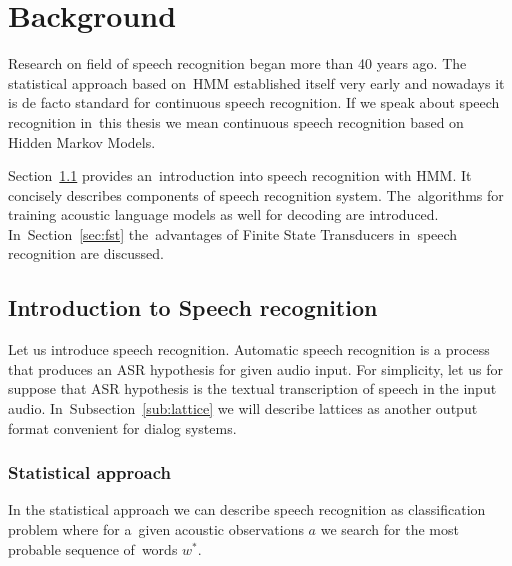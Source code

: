 \chapter{Background}
\label{cha:background}

% 
% 

Research on field of speech recognition began more than 40 years ago. The statistical approach based 
on~\ac{HMM} established itself very early and nowadays it is de facto standard for continuous speech recognition. 
If we speak about speech recognition in~this thesis we mean continuous speech recognition based on Hidden Markov Models. 

Section~\ref{sec:general_introduction} provides an~introduction into speech recognition with \ac{HMM}. 
It concisely describes components of speech recognition system. The~algorithms for training acoustic language models 
as well for decoding are introduced. In~Section~\ref{sec:fst} the~advantages of Finite State Transducers 
in~speech recognition are discussed.

\section{Introduction to Speech recognition} 
\label{sec:general_introduction}
Let us introduce speech recognition. Automatic speech recognition is a process
that produces an \ac{ASR} hypothesis for given audio input. 
For simplicity, let us for suppose that ASR hypothesis is the textual transcription of speech in the input audio. 
In~Subsection~\ref{sub:lattice} we will describe lattices as another output format convenient for dialog systems.

\subsection*{Statistical approach}
\label{sub:statistical_approach}
In the statistical approach we can describe speech recognition as classification problem where 
for a~given acoustic observations $a$ we search for the most probable sequence of~words $w^*$.

